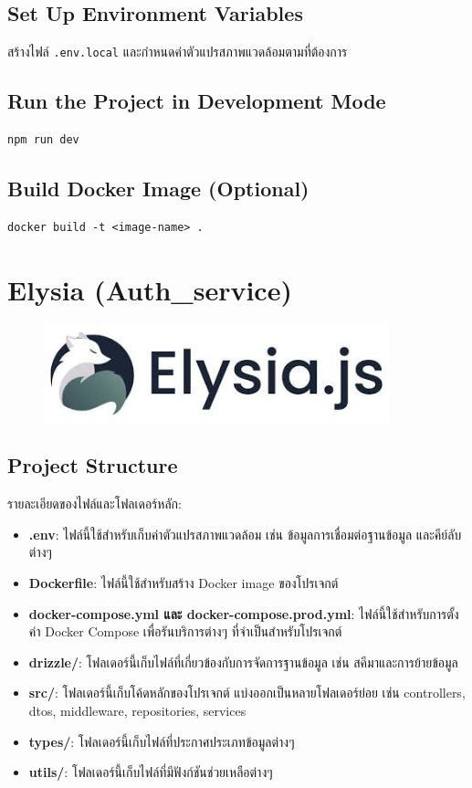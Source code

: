 \subsection{Set Up Environment Variables}
สร้างไฟล์ \texttt{.env.local} และกำหนดค่าตัวแปรสภาพแวดล้อมตามที่ต้องการ

\subsection{Run the Project in Development Mode}
\begin{verbatim}
npm run dev
\end{verbatim}

\subsection{Build Docker Image (Optional)}
\begin{verbatim}
docker build -t <image-name> .
\end{verbatim}

\section{Elysia (Auth\_service)}
\begin{figure}[H]
    \centering
    \includegraphics[width=100mm, keepaspectratio ]{pictures/elysia.jpg}
\end{figure}

\subsection{Project Structure}
รายละเอียดของไฟล์และโฟลเดอร์หลัก:
\begin{itemize}
    \item \textbf{.env}: ไฟล์นี้ใช้สำหรับเก็บค่าตัวแปรสภาพแวดล้อม เช่น ข้อมูลการเชื่อมต่อฐานข้อมูล และคีย์ลับต่างๆ
    \item \textbf{Dockerfile}: ไฟล์นี้ใช้สำหรับสร้าง Docker image ของโปรเจกต์
    \item \textbf{docker-compose.yml และ docker-compose.prod.yml}: ไฟล์นี้ใช้สำหรับการตั้งค่า Docker Compose เพื่อรันบริการต่างๆ ที่จำเป็นสำหรับโปรเจกต์
    \item \textbf{drizzle/}: โฟลเดอร์นี้เก็บไฟล์ที่เกี่ยวข้องกับการจัดการฐานข้อมูล เช่น สคีมาและการย้ายข้อมูล
    \item \textbf{src/}: โฟลเดอร์นี้เก็บโค้ดหลักของโปรเจกต์ แบ่งออกเป็นหลายโฟลเดอร์ย่อย เช่น controllers, dtos, middleware, repositories, services
    \item \textbf{types/}: โฟลเดอร์นี้เก็บไฟล์ที่ประกาศประเภทข้อมูลต่างๆ
    \item \textbf{utils/}: โฟลเดอร์นี้เก็บไฟล์ที่มีฟังก์ชันช่วยเหลือต่างๆ
\end{itemize}

